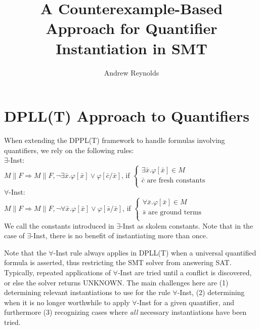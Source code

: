 \documentclass{llncs}
\begin{document}
\pagestyle{plain}

\title{A Counterexample-Based Approach for Quantifier Instantiation in SMT}

\author{Andrew Reynolds}

\date{}

\maketitle
\thispagestyle{empty}

\section{DPLL(T) Approach to Quantifiers}

When extending the DPPL(T) framework to handle formulas involving quantifiers, we rely on the following rules: \\

\noindent $\exists$-Inst: \\

$M \parallel F \Longrightarrow M \parallel F, \neg \exists \bar{x}. \varphi[ \bar{ x } ] \vee \varphi[ \bar{ c }/\bar{x} ]$, if   
$\begin{cases}
  \exists \bar{x}. \varphi[ \bar{ x } ] \in M \\
  \bar{ c } \text{ are fresh constants} \\
\end{cases}$ \\

\noindent $\forall$-Inst: \\

$M \parallel F \Longrightarrow M \parallel F, \neg \forall \bar{x}. \varphi[ \bar{ x } ] \vee \varphi[ \bar{ s }/\bar{x} ]$, if   
$\begin{cases}
  \forall \bar{x}. \varphi[ \bar{ x } ] \in M \\
  \bar{ s } \text{ are ground terms} \\
\end{cases}$ \\

We call the constants introduced in $\exists$-Inst as skolem constants.
Note that in the case of $\exists$-Inst, there is no benefit of instantiating more than once.

Note that the $\forall$-Inst rule always applies in DPLL(T) when a universal quantified formula is asserted, thus restricting the SMT solver from answering SAT.
Typically, repeated applications of $\forall$-Inst are tried until a conflict is discovered, or else the solver returns UNKNOWN.
The main challenges here are (1) determining relevant instantiations to use for the rule $\forall$-Inst, (2) determining when it is no longer worthwhile to apply $\forall$-Inst for a given quantifier, and furthermore (3) recognizing cases where \emph{all} necessary instantiations have been tried.
\end{document}
